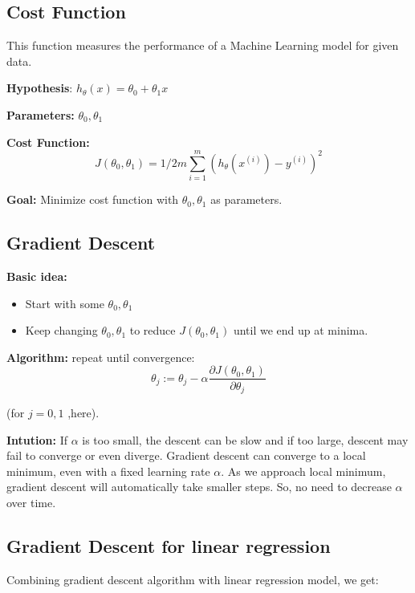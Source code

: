 \documentclass[12pt, A4]{report}
\begin{document}
  \subsection{Cost Function}
    This function measures the performance of a Machine Learning model for given data.

    \textbf{Hypothesis}: $ h_ \theta(x) = \theta_0 + \theta_1x $

    \textbf{Parameters:} $ \theta_0, \theta_1 $

    \textbf{Cost Function:} 
    \begin{equation} \label {eq:1}
        J( \theta_0, \theta_1 ) = 1/2m \sum_{i=1}^{m} (h_\theta(x^{(i)})-y^{(i)})^2 
    \end{equation} 

    \textbf{Goal:} Minimize cost function with $ \theta_0, \theta_1 $ as parameters.

  \subsection{Gradient Descent}

    \textbf{Basic idea:}
    \begin{itemize}
    \item Start with some $ \theta_0, \theta_1 $
    \item Keep changing $ \theta_0, \theta_1 $ to reduce $ J(\theta_0, \theta_1) $ until we end up at minima.
    \end{itemize} 

    \textbf{Algorithm:}
     repeat until convergence:
    \begin{equation} \label {eq:2}
        \theta_j := \theta_j - \alpha \frac{\partial {J(\theta_0, \theta_1)}}{\partial \theta_j}
    \end{equation} 

    (for  $j = 0, 1 $  ,here).  

    \textbf{Intution:} 
    If $\alpha$ is too small, the descent can be slow and if too large, descent may fail to converge or even diverge.
    Gradient descent can converge to a local minimum, even with a fixed learning rate $\alpha$. As we approach local minimum, gradient descent will automatically take smaller steps. So, no need to decrease $\alpha$ over time. 

  \subsection{Gradient Descent for linear regression}
    Combining gradient descent algorithm with linear regression model, we get:
\end{document}

